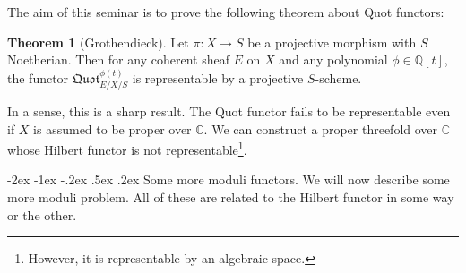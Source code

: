 \documentclass[11pt]{amsart}
\makeatletter
\renewcommand\subsection{\@startsection {subsection}{1}{\z@}%
	{-2ex \@plus -1ex \@minus -.2ex}%
	{.5ex \@plus.2ex}%
	{\normalfont\bfseries}}
\newcommand{\C}{{\mathbb C}}
\newcommand{\Q}{{\mathbb Q}}
\theoremstyle{definition}
\newtheorem{theorem}{Theorem}[section]
\makeatother
\begin{document}
The aim of this seminar is to prove the following theorem about Quot functors:

\begin{theorem}[Grothendieck]
	Let $\pi: X\rightarrow S$ be a projective morphism with $S$ Noetherian. Then for any coherent sheaf $E$ on $X$ and any polynomial $\phi \in \Q[t]$, the functor $\mathfrak{Quot}^{\phi(t)}_{E/X/S}$ is representable by a projective $S$-scheme.
\end{theorem}

In a sense, this is a sharp result. The Quot functor fails to be representable even if $X$ is assumed to be proper over $\C$. We can construct a proper threefold over $\C$ whose Hilbert functor is not representable\footnote{However, it is representable by an algebraic space.}.

\subsection{Some more moduli functors.}
We will now describe some more moduli problem. All of these are related to the Hilbert functor in some way or the other.
\end{document}
